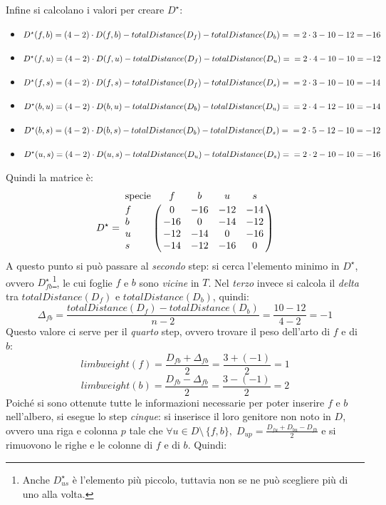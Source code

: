 Infine si calcolano i valori per creare $D^\star$:
\begin{itemize}
	\item $D^\star(f,b)=(4-2)\cdot D(f,b)-totalDistance(D_f)-totalDistance(D_b)=\\=2\cdot3-10-12=-16$
	\item $D^\star(f,u)=(4-2)\cdot D(f,u)-totalDistance(D_f)-totalDistance(D_u)=\\=2\cdot4-10-10=-12$
	\item $D^\star(f,s)=(4-2)\cdot D(f,s)-totalDistance(D_f)-totalDistance(D_s)=\\=2\cdot3-10-10=-14$	
	\item $D^\star(b,u)=(4-2)\cdot D(b,u)-totalDistance(D_b)-totalDistance(D_u)=\\=2\cdot4-12-10=-14$	
	\item $D^\star(b,s)=(4-2)\cdot D(b,s)-totalDistance(D_b)-totalDistance(D_s)=\\=2\cdot5-12-10=-12$
	\item $D^\star(u,s)=(4-2)\cdot D(u,s)-totalDistance(D_u)-totalDistance(D_s)=\\=2\cdot2-10-10=-16$
\end{itemize}
Quindi la matrice è:
\[D^\star = \bordermatrix{\text{specie}&f&b&u&s\cr
                f& 0 & -16 & -12 & -14\cr
                b& -16 & 0 & -14 & -12\cr
                u& -12 & -14 & 0 & -16\cr
                s& -14 & -12 & -16 & 0}
\]
A questo punto si può passare al \textit{secondo} step: si cerca l'elemento minimo in $D^\star$, ovvero $D^\star_{fb}$\footnote{Anche $D^\star_{us}$ è l'elemento più piccolo, tuttavia non se ne può scegliere più di uno alla volta.}, le cui foglie $f$ e $b$ sono \textit{vicine} in $T$.
\newline
Nel \textit{terzo} invece si calcola il \textit{delta} tra $totalDistance(D_f)$ e $totalDistance(D_b)$, quindi:
\[\Delta_{fb}=\frac{totalDistance(D_f)-totalDistance(D_b)}{n-2}=\frac{10-12}{4-2}=-1\]
Questo valore ci serve per il \textit{quarto} step, ovvero trovare il peso dell'arto di $f$ e di $b$:
\[limbweight(f)=\frac{D_{fb}+\Delta_{fb}}{2}=\frac{3+(-1)}{2}=1\]
\[limbweight(b)=\frac{D_{fb}-\Delta_{fb}}{2}=\frac{3-(-1)}{2}=2\]
Poiché si sono ottenute tutte le informazioni necessarie per poter inserire $f$ e $b$ nell'albero, si esegue lo step \textit{cinque}: si inserisce il loro genitore non noto in $D$, ovvero una riga e colonna $p$ tale che $\forall u\in D\setminus \, \{f,b\}, \; D_{up}=\frac{D_{fu}+D_{bu}-D_{fb}}{2}$ e si rimuovono le righe e le colonne di $f$ e di $b$. Quindi:
